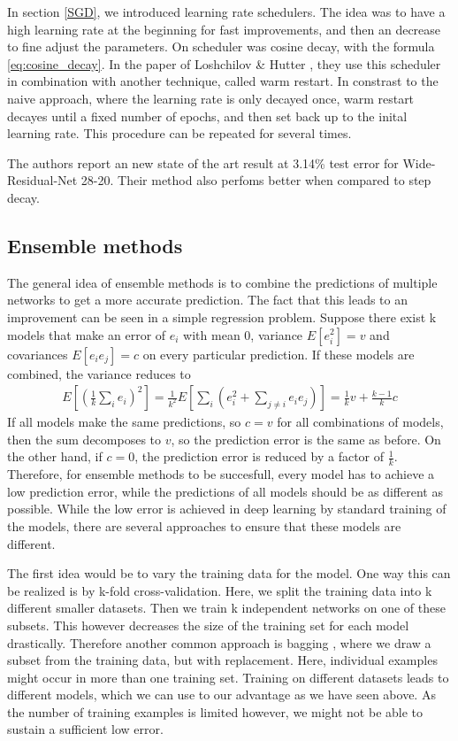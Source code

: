 In section \ref{SGD}, we introduced learning rate schedulers. The idea was to
have a high learning rate at the beginning for fast improvements, and then an
decrease to fine adjust the parameters. On scheduler was cosine decay, with the
formula \ref{eq:cosine_decay}. In the paper of Loshchilov \& Hutter
\cite{loshchilov2016sgdr}, they use this scheduler in combination with another
technique, called warm restart. In constrast to the naive approach, where the
learning rate is only decayed once, warm restart decayes until a fixed number of
epochs, and then set back up to the inital learning rate. This procedure can be
repeated for several times. 

The authors report an new state of the art result at 3.14\% test error for
Wide-Residual-Net 28-20. Their method also perfoms better when compared to step
decay. 


\subsection{Ensemble methods}\label{sub:Ensemble_Methods}
The general idea of ensemble methods is to combine the predictions of multiple
networks to get a more accurate prediction. The fact that this leads to an
improvement can be seen in a simple regression problem. Suppose there exist k
models that make an error of $e_i$ with mean 0, variance $E[e_i^2]=v$ and
covariances $E[e_i e_j]=c$ on every particular prediction. If these models are
combined, the variance reduces to 
\begin{align}
    E[(\frac{1}{k} \sum_i e_i)^2]=\frac{1}{k^2}E[\sum_i (e_i^2 + \sum_{j\neq i} e_i e_j)]=\frac{1}{k}v+\frac{k-1}{k}c
\end{align}
If all models make the same predictions, so $c=v$ for all combinations of
models, then the sum decomposes to $v$, so the prediction error is the same as
before. On the other hand, if $c=0$, the prediction error is reduced by a factor
of $\frac{1}{k}$. Therefore, for ensemble methods to be succesfull, every model
has to achieve a low prediction error, while the predictions of all models
should be as different as possible. While the low error is achieved in deep
learning by standard training of the models, there are several approaches to
ensure that these models are different. 

The first idea would be to vary the training data for the model. One way this
can be realized is by k-fold cross-validation. Here, we split the training data
into k different smaller datasets. Then we train k independent networks on one
of these subsets. This however decreases the size of the training set for each
model drastically. Therefore another common approach is bagging
\cite{breiman1996bagging}, where we draw a subset from the training data, but
with replacement. Here, individual examples might occur in more than one
training set. Training on different datasets leads to different models, which we
can use to our advantage as we have seen above. As the number of training
examples is limited however, we might not be able to sustain a sufficient low
error.

